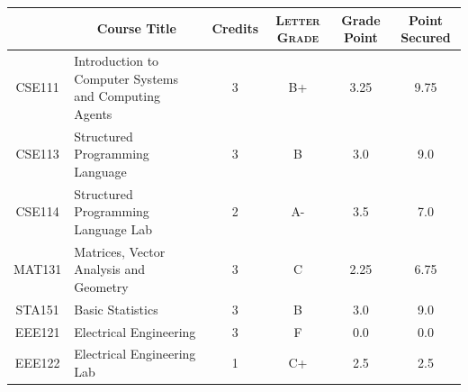 \documentclass[11pt]{article}
\newcommand*{\numtwo}[1]{\pgfmathprintnumber[
                    fixed, precision=2, fixed zerofill=true]{#1}}
\begin{document}
                \begin{center}
                    \renewcommand{\arraystretch}{1.08}
                    
                \begin{tabular}{|c|l|c|>{\scshape}c|c|c|}
                \hline  \rule[-1ex]{0pt}{3.5ex} {\centering{\bf Course Code}} &  \multicolumn{1}{c|}{\textbf{Course Title}}  & {\bf Credits} & {\bf Letter Grade} & {\bf Grade Point} & {\bf Point Secured}  \\ 
                \hline   CSE111 &  Introduction to Computer Systems and Computing Agents		 & 3 & B+ & 3.25 & 9.75 \\ %
                \hline   CSE113 &  Structured Programming Language		 & 3 & B & 3.0 & 9.0 \\ %
                \hline   CSE114 &  Structured Programming Language Lab		 & 2 & A- & 3.5 & 7.0 \\ %
                \hline   MAT131 &  Matrices, Vector Analysis and Geometry		 & 3 & C & 2.25 & 6.75 \\ %
                \hline   STA151 &  Basic Statistics		 & 3 & B & 3.0 & 9.0 \\ %
                \hline   EEE121 &  Electrical Engineering		 & 3 & F & 0.0 & 0.0 \\ %
                \hline   EEE122 &  Electrical Engineering Lab		 & 1 & C+ & 2.5 & 2.5 \\ %

\hline                %
                \end{tabular}
                \end{center}
                \renewcommand{\arraystretch}{1.03}
\end{document}
